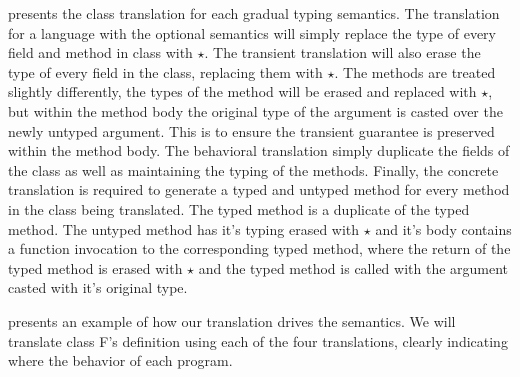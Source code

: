 \documentclass[runnningheads]{tex/llncs}
\begin{document}
 presents the class translation for each gradual typing
semantics. The translation for a language with the optional semantics 
will simply replace the type of every field and method in class with $\star$.
The transient translation will also erase the type of every field in the class,
replacing them with $\star$. The methods are treated slightly differently, the types of
the method will be erased and replaced with $\star$, but within the method body the
original type of the argument is casted over the newly untyped argument. This is
to ensure the transient guarantee is preserved within the method body.
The behavioral translation simply duplicate the fields of the class as well 
as maintaining the typing of the methods. Finally, the concrete translation 
is required to generate a typed and untyped method for every method in the class 
being translated. The typed method is a duplicate of the typed method. 
The untyped method has it's typing erased with $\star$ and it's
body contains a function invocation to the corresponding typed method, where
the return of the typed method is erased with $\star$ and the typed method is 
called with the argument casted with it's original type.

 presents an example of how our translation drives the semantics.
We will translate class {\xt F}'s definition using each of the four translations, clearly
indicating where the behavior of each program.
\end{document}
